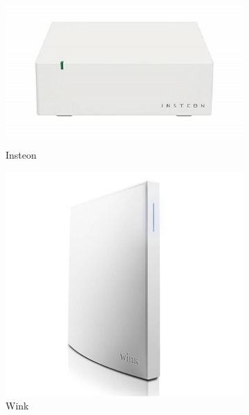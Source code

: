 \documentclass[12pt, oneside, a4paper]{book}
\begin{document}
		\begin{figure}[H]
			\begin{subfigure}[b]{.5\linewidth}
				\includegraphics[width=\linewidth]{img/insteon_hw.png}
				\caption{Insteon}
			\end{subfigure}
			\begin{subfigure}[b]{.5\linewidth}
				\includegraphics[width=\linewidth]{img/wink_hw.png}
				\caption{Wink}
			\end{subfigure}
			\begin{subfigure}[b]{.5\linewidth}

\end{subfigure}
\end{figure}
\end{document}
